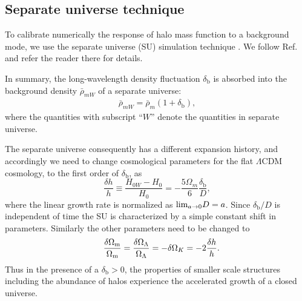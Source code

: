 \documentclass[prd,twocolumn,amsmath,amssymb,floatfix,superscriptaddress]{revtex4-1}
\newcommand{\br}{\textrm{b}}
\begin{document}
\subsection{Separate universe technique}
\label{sub:SU}


 To calibrate numerically the response of halo mass
function to a background mode, we use the separate universe (SU)
simulation technique \cite{Sirko:05,Baldauf:2011bh,Lietal:14a,Lietal:14b}.  
We follow Ref.~\cite{Lietal:14a} and refer the reader there for details. 

In summary, the long-wavelength density fluctuation $\delta_\br$ is
absorbed into the background density $\bar{\rho}_{mW}$ of a separate
universe:
%
\begin{eqnarray}
 \bar{\rho}_{mW}=\bar{\rho}_m(1+\delta_\br), 
\end{eqnarray}
%
where the quantities with subscript ``$W$'' denote the quantities in
separate universe. 


The separate universe consequently has a different expansion history, and accordingly
we need to change cosmological parameters for the  flat $\Lambda$CDM cosmology, to
the first order of $\delta_\br$, as
%
\begin{equation}
 \frac{\delta h}{h}\equiv
  \frac{H_{0W}-H_0}{H_0}=-\frac{5\Omega_m}{6}\frac{\delta_\br}{D}, 
  \label{eqn:su_h}
\end{equation}
%
where the linear growth rate is normalized as ${\rm lim}_{a\rightarrow 0} D=a$. 
Since $\delta_\br/D$ is independent of time the SU is characterized by a simple constant shift in parameters. 
 Similarly the other parameters need to be changed to 
%
\begin{eqnarray}
&& \frac{\delta \Omega_{\rm m}}{\Omega_{\rm m}}=\frac{\delta
 \Omega_\Lambda}{\Omega_\Lambda}= -\delta \Omega_K =-2\frac{\delta h}{h}.
\end{eqnarray}
%
Thus in the presence of a $\delta_\br>0$, the properties of smaller scale structures including the abundance
of halos experience the accelerated growth of a closed universe.
\end{document}

